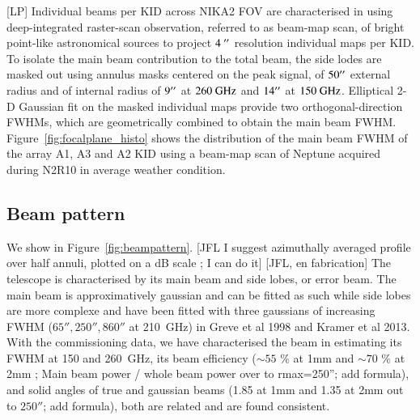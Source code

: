 \documentclass[]{aa} %
\begin{document}
[LP]
Individual beams per KID across NIKA2 FOV are characterised in using
deep-integrated raster-scan observation, referred to as beam-map scan, of bright point-like
astronomical sources to project $4~\hbox{$^{\prime\prime}$}$ resolution individual maps
per KID. To isolate the main beam contribution to the total beam, the
side lodes are masked out using annulus masks centered on the peak
signal, of $50\hbox{$^{\prime\prime}$}$ external radius and of internal radius of
$9\hbox{$^{\prime\prime}$}$ at $260~\rm{GHz}$ and $14\hbox{$^{\prime\prime}$}$ at
$150~\rm{GHz}$. Elliptical 2-D Gaussian fit on the masked individual
maps provide two orthogonal-direction FWHMs, which are geometrically
combined to obtain the main beam FWHM. Figure~\ref{fig:focalplane_histo} shows the distribution of the main
beam FWHM of the array A1, A3 and A2 KID using a beam-map scan of Neptune acquired during N2R10 in average weather condition.





\subsection{Beam pattern}
We show in Figure~\ref{fig:beampattern}.  [JFL I suggest azimuthally averaged profile over half annuli, plotted on a dB scale ; I can do it] 
[JFL, en fabrication] The telescope is characterised by its main beam and side lobes, or error beam.
The main beam is approximatively gaussian and can be fitted as such
while side lobes are more complexe and have been fitted with  three gaussians of increasing FWHM ($65'', 250'', 860''$ at 210~GHz)
in Greve et al 1998 and Kramer et al 2013.  With the commissioning data, we have characterised 
the beam in estimating its FWHM at 150 and 260~GHz,  its beam efficiency ($\sim 55$ \% at 1mm and $\sim 70$ \% at 2mm ; Main beam power / whole beam power over to rmax=250''; add formula),
and  solid angles of true and gaussian beams (1.85 at 1mm and 1.35 at 2mm  out to $250''$; add formula), both are related and are found consistent.
\end{document}
